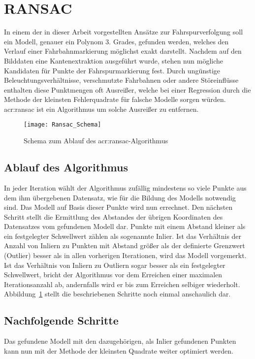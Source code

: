 \section{RANSAC \dcsecondauthorshort}
In einem der in dieser Arbeit vorgestellten Ansätze zur Fahrspurverfolgung soll ein Modell, genauer ein Polynom 3. Grades, gefunden werden, welches den Verlauf einer Fahrbahnmarkierung möglichst exakt darstellt. Nachdem auf den Bilddaten eine Kantenextraktion ausgeführt wurde, stehen nun mögliche Kandidaten für Punkte der Fahrspurmarkierung fest. Durch ungünstige Beleuchtungsverhältnisse, verschmutzte Fahrbahnen oder andere Störeinflüsse enthalten diese Punktmengen oft Ausreißer, welche bei einer Regression durch die Methode der kleinsten Fehlerquadrate für falsche Modelle sorgen würden. \gls{acr:ransac} \autocite{fischler1981random} ist ein Algorithmus um solche Ausreißer zu entfernen.

\begin{figure}[H]
  \centering
  \texttt{[image: Ransac\_Schema]}
  \caption{Schema zum Ablauf des \gls{acr:ransac}-Algorithmus}
  \label{fig:ransac_scheme}
\end{figure}

\subsection{Ablauf des Algorithmus} \label{ssec:grunglagen:ransac:ablauf}
In jeder Iteration wählt der Algorithmus zufällig mindestens so viele Punkte aus dem ihm übergebenen Datensatz, wie für die Bildung des Modells notwendig sind. Das Modell auf Basis dieser Punkte wird nun errechnet. Den nächsten Schritt stellt die Ermittlung des Abstandes der übrigen Koordinaten des Datensatzes vom gefundenen Modell dar. Punkte mit einem Abstand kleiner als ein festgelegter Schwellwert zählen als sogenannte Inlier. Ist das Verhältnis der Anzahl von Inliern zu Punkten mit Abstand größer als der definierte Grenzwert (Outlier) besser als in allen vorherigen Iterationen, wird das Modell vorgemerkt. Ist das Verhältnis von Inliern zu Outliern sogar besser als ein festgelegter Schwellwert, bricht der Algorithmus vor dem Erreichen einer maximalen Iterationsanzahl ab, andernfalls wird er bis zum Erreichen selbiger wiederholt. Abbildung~\ref{fig:ransac_scheme} stellt die beschriebenen Schritte noch einmal anschaulich dar.

\subsection{Nachfolgende Schritte}
Das gefundene Modell mit den dazugehörigen, als Inlier gefundenen Punkten kann nun mit der Methode der kleinsten Quadrate weiter optimiert werden.




